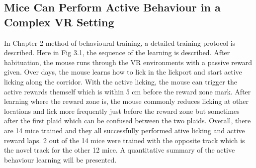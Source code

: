 \subsection{Mice Can Perform Active Behaviour in a Complex VR Setting}


In Chapter 2 method of behavioural training, a detailed training protocol is described. Here in Fig 3.1, the sequence of the learning is described. After habituation, the mouse runs through the VR environments with a passive reward given. Over days, the mouse learns how to lick in the lickport and start active licking along the corridor. With the active licking, the mouse can trigger the active rewards themself which is within 5 cm before the reward zone mark. After learning where the reward zone is, the mouse commonly reduces licking at other locations and lick more frequently just before the reward zone but sometimes after the first plaid which can be confused between the two plaids. Overall, there are 14 mice trained and they all successfully performed ative licking and active reward laps. 2 out of the 14 mice were trained with the opposite track which is the novel track for the other 12 mice. A quantitative summary of the active behaviour learning will be presented.


